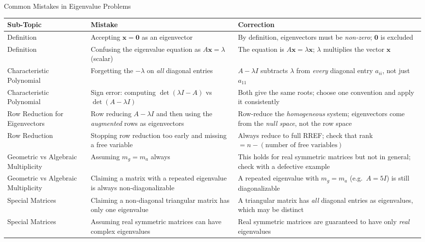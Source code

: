 \documentclass[12pt,a4paper]{article}
\begin{document}
\begin{mistakebox}{Common Mistakes in Eigenvalue Problems}
\begin{tabular}{@{}p{4cm} p{5cm} p{5cm}@{}}
\toprule
\textbf{Sub-Topic} & \textbf{Mistake} & \textbf{Correction} \\
\midrule
Definition &
  Accepting $\mathbf{x}=\mathbf{0}$ as an eigenvector &
  By definition, eigenvectors must be \emph{non-zero}; $\mathbf{0}$ is excluded \\
\addlinespace
Definition &
  Confusing the eigenvalue equation as $A\mathbf{x}=\lambda$ (scalar) &
  The equation is $A\mathbf{x}=\lambda\mathbf{x}$; $\lambda$ multiplies the vector $\mathbf{x}$ \\
\addlinespace
Characteristic Polynomial &
  Forgetting the $-\lambda$ on \emph{all} diagonal entries &
  $A-\lambda I$ subtracts $\lambda$ from \emph{every} diagonal entry $a_{ii}$, not just $a_{11}$ \\
\addlinespace
Characteristic Polynomial &
  Sign error: computing $\det(\lambda I - A)$ vs $\det(A - \lambda I)$ &
  Both give the same roots; choose one convention and apply it consistently \\
\addlinespace
Row Reduction for Eigenvectors &
  Row reducing $A-\lambda I$ and then using the \emph{augmented} rows as eigenvectors &
  Row-reduce the \emph{homogeneous} system; eigenvectors come from the \emph{null space}, not the row space \\
\addlinespace
Row Reduction &
  Stopping row reduction too early and missing a free variable &
  Always reduce to full RREF; check that rank $= n - (\text{number of free variables})$ \\
\addlinespace
Geometric vs Algebraic Multiplicity &
  Assuming $m_g = m_a$ always &
  This holds for real symmetric matrices but not in general; check with a defective example \\
\addlinespace
Geometric vs Algebraic Multiplicity &
  Claiming a matrix with a repeated eigenvalue is always non-diagonalizable &
  A repeated eigenvalue with $m_g=m_a$ (e.g.\ $A=5I$) is still diagonalizable \\
\addlinespace
Special Matrices &
  Claiming a non-diagonal triangular matrix has only one eigenvalue &
  A triangular matrix has \emph{all} diagonal entries as eigenvalues, which may be distinct \\
\addlinespace
Special Matrices &
  Assuming real symmetric matrices can have complex eigenvalues &
  Real symmetric matrices are guaranteed to have only \emph{real} eigenvalues \\
\bottomrule
\end{tabular}
\end{mistakebox}
\end{document}
